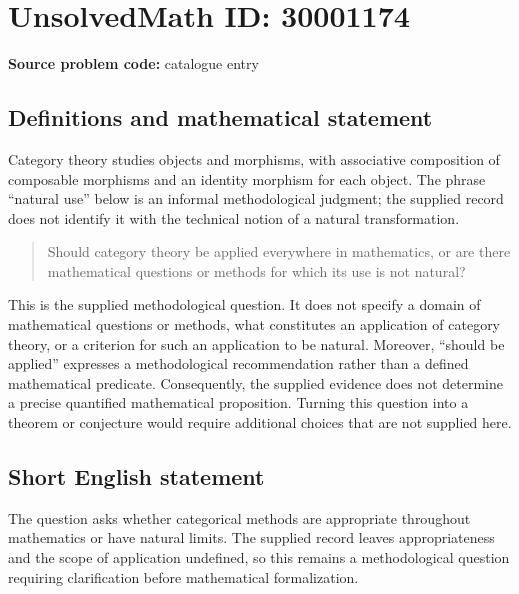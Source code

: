 \documentclass[11pt]{article}
\begin{document}
\section*{UnsolvedMath ID: 30001174}
\textbf{Source problem code:} catalogue entry
\subsection{Definitions and mathematical statement}
Category theory studies objects and morphisms, with associative composition of composable morphisms and an identity morphism for each object. The phrase ``natural use'' below is an informal methodological judgment; the supplied record does not identify it with the technical notion of a natural transformation.

\begin{quote}
Should category theory be applied everywhere in mathematics, or are there mathematical questions or methods for which its use is not natural?
\end{quote}

This is the supplied methodological question. It does not specify a domain of mathematical questions or methods, what constitutes an application of category theory, or a criterion for such an application to be natural. Moreover, ``should be applied'' expresses a methodological recommendation rather than a defined mathematical predicate. Consequently, the supplied evidence does not determine a precise quantified mathematical proposition. Turning this question into a theorem or conjecture would require additional choices that are not supplied here.
\subsection{Short English statement}
The question asks whether categorical methods are appropriate throughout mathematics or have natural limits. The supplied record leaves appropriateness and the scope of application undefined, so this remains a methodological question requiring clarification before mathematical formalization.
\end{document}
